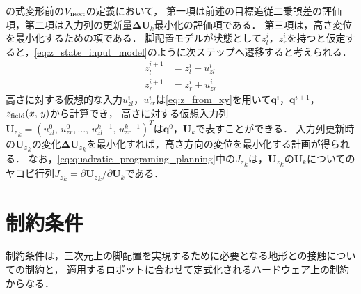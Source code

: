 \documentclass[autodetect-engine,dvipdfmx-if-dvi,ja=standard,a4j,jbase=11pt,magstyle=nomag*]{bxjsreport}
\begin{document}
の式変形前の$V_{\mathrm{next}}$の定義において，
第一項は前述の目標追従二乗誤差の評価項，第二項は入力列の更新量$\bm{\Delta U}_k$最小化の評価項である．
第三項は，高さ変位を最小化するための項である．
脚配置モデルが状態として$z_l^i$，$z_r^i$を持つと仮定すると，\cref{eq:z_state_input_model}のように次ステップへ遷移すると考えられる．
\begin{equation} \label{eq:z_state_input_model}
    \begin{aligned}
        z_l^{i + 1} & = z_l^i + u_{zl}^i \\
        z_r^{i + 1} & = z_r^i + u_{zr}^i
    \end{aligned}
\end{equation}
高さに対する仮想的な入力$u_{zl}^i$，$u_{zr}^i$は\cref{eq:z_from_xy}を用いて$\bm{q}^i$，$\bm{q}^{i + 1}$，$z_{\mathrm{field}} ( x ,\, y )$から計算でき，
高さに対する仮想入力列${\bm{U}_z}_k = ( u_{zl}^0 ,\, u_{zr}^0 , \dots ,\, u_{zl}^{k - 1} ,\, u_{zr}^{k - 1} )^T$は$\bm{q}^0$，$\bm{U}_k$で表すことができる．
入力列更新時の${\bm{U}_z}_k$の変化${\bm{\Delta U}_z}_k$を最小化すれば，高さ方向の変位を最小化する計画が得られる．
なお，\cref{eq:quadratic_programing_planning}中の${J_z}_k$は，${\bm{U}_z}_k$の$\bm{U}_k$についての
ヤコビ行列${J_z}_k = \partial {\bm{U}_z}_k / \partial \bm{U}_k$である．


\section{制約条件}
\label{seq:constraints}
制約条件は，三次元上の脚配置を実現するために必要となる地形との接触についての制約と，
適用するロボットに合わせて定式化されるハードウェア上の制約からなる．
\end{document}
